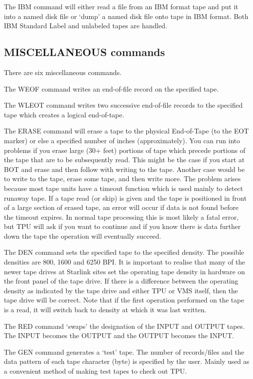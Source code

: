 The IBM command will either read a file from an IBM format tape and put it into
a named disk file or `dump' a named disk file onto tape in IBM format.
Both IBM Standard Label and unlabeled tapes are handled.

\subsection{MISCELLANEOUS commands}

There are six miscellaneous commands.

The WEOF command writes an end-of-file record on the specified tape.

The WLEOT command writes two successive end-of-file records to the specified
tape which creates a logical end-of-tape.

The ERASE command will erase a tape to the physical End-of-Tape (to the EOT
marker) or else a specified number of inches (approximately).
You can run into problems if you erase large (30+ feet) portions of tape which
precede portions of the tape that are to be subsequently read.
This might be the case if you start at BOT and erase and then follow with
writing to the tape.
Another case would be to write to the tape, erase some tape, and then write
more.
The problem arises because most tape units have a timeout function which is used
mainly to detect runaway tape.
If a tape read (or skip) is given and the tape is positioned in front of a large
section of erased tape, an error will occur if data is not found before the
timeout expires.
In normal tape processing this is most likely a fatal error, but TPU will ask if
you want to continue and if you know there is data further down the tape the
operation will eventually succeed.

The DEN command sets the specified tape to the specified density.
The possible densities are 800, 1600 and 6250 BPI.
It is important to realise that many of the newer tape drives at
Starlink sites set the operating tape density in hardware on the
front panel of the tape drive. If there is a difference between the
operating density as indicated by the tape drive and either
TPU or VMS itself, then the tape drive will be correct.
Note that if the first operation performed on the tape is a read, it will
switch back to density at which it was last written.

The RED command `swaps' the designation of the INPUT and OUTPUT tapes.
The INPUT becomes the OUTPUT and the OUTPUT becomes the INPUT.

The GEN command generates a `test' tape.
The number of records/files and the data pattern of each tape character (byte)
is specified by the user.
Mainly used as a convenient method of making test tapes to check out TPU.

